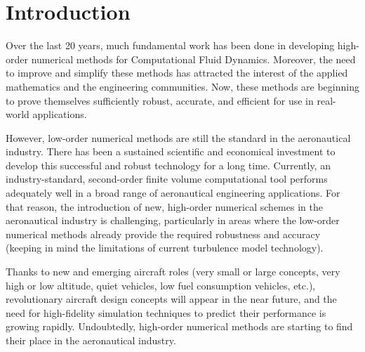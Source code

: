
\section{Introduction}

Over the last 20 years, much fundamental work has been done in developing high-order numerical methods for Computational Fluid Dynamics. Moreover, the need to improve and simplify these methods has attracted the interest of the applied mathematics and the engineering communities. Now, these methods are beginning to prove themselves sufficiently robust, accurate, and efficient for use in real-world applications.

However, low-order numerical methods are still the standard in the aeronautical industry. There has been a sustained scientific and economical investment to develop this successful and robust technology for a long time. Currently, an industry-standard, second-order finite volume computational tool performs adequately well in a broad range of aeronautical engineering applications. For that reason, the introduction of new, high-order numerical schemes in the aeronautical industry is challenging, particularly in areas where the low-order numerical methods already provide the required robustness and accuracy (keeping in mind the limitations of current turbulence model technology).

Thanks to new and emerging aircraft roles (very small or large concepts, very high or low altitude, quiet vehicles, low fuel consumption vehicles, etc.), revolutionary aircraft design concepts will appear in the near future, and the need for high-fidelity simulation techniques to predict their performance is growing rapidly. Undoubtedly, high-order numerical methods are starting to find their place in the aeronautical industry. 

